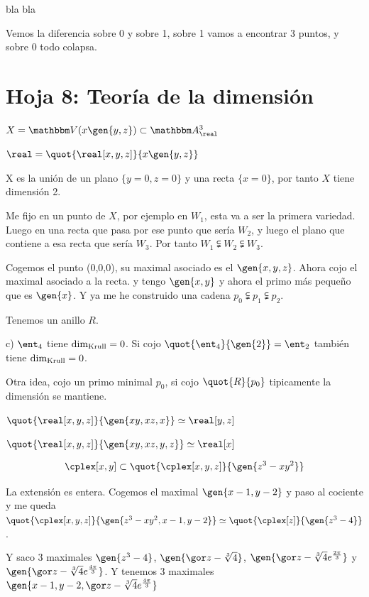 \begin{problem}[6]
	bla bla

	\solution

	Vemos la diferencia sobre 0 y sobre 1, sobre 1 vamos a encontrar 3 puntos, y sobre 0 todo colapsa.
\end{problem}


\section{Hoja 8: Teoría de la dimensión}

\begin{problem}[4]
	$X= \V(x \gen{y,z}) \subset \A^3_{\real}$

	$\real= \quot{\real[x,y,z]}{x\gen{y,z}}$
	\solution

	X es la unión de un plano $\{ y=0, z=0 \}$ y una recta $\{ x=0 \}$, por tanto $X$ tiene dimensión 2.

	Me fijo en un punto de $X$, por ejemplo en $W_1$, esta va a ser la primera variedad. Luego en una recta que pasa por ese punto que sería $W_2$, y luego el plano que contiene a esa recta que sería $W_3$. Por tanto $W_1 \subsetneqq W_2 \subsetneqq W_3$.

	Cogemos el punto (0,0,0), su maximal asociado es el $\gen{x,y,z}$. Ahora cojo el maximal asociado a la recta. y tengo $\gen{x,y}$ y ahora el primo más pequeño que es $\gen{x}$. Y ya me he construido una cadena $p_0 \subsetneqq p_1 \subsetneqq p_2$.
\end{problem}

\begin{problem}[3]
	Tenemos un anillo $R$.

	\solution

	c) $\ent_4$ tiene $\dim_{\mathrm{Krull}}=0$. Si cojo $\quot{\ent_4}{\gen{2}}=\ent_2$ también tiene $\dim_{\mathrm{Krull}} = 0$.

	Otra idea, cojo un primo minimal $p_0$, si cojo $\quot{R}{p_0}$ tipicamente la dimensión se mantiene.

	$\quot{\real[x,y,z]}{\gen{xy,xz,x}} \simeq \real[y,z]$

	$\quot{\real[x,y,z]}{\gen{xy,xz,y,z}} \simeq \real[x]$
\end{problem}

\begin{problem}[6]

	$$ \cplex[x,y] \subset \quot{\cplex[x,y,z]}{\gen{z^3-xy^2}} $$


	\solution

	La extensión es entera. Cogemos el maximal $\gen{x-1, y-2}$ y paso al cociente y me queda $\quot{\cplex[x,y,z]}{\gen{z^3-xy^2, x-1, y-2}} \simeq \quot{\cplex[z]}{\gen{z^3-4}}$.

	Y saco 3 maximales $\gen{z^3-4}$, $\gen{\cls{z}-\sqrt[3]{4}}$, $\gen{\cls{z}-\sqrt[3]{4}e^{\frac{2 \pi}{3}}}$ y $\gen{\cls{z}-\sqrt[3]{4}e^{\frac{4 \pi}{3}}}$. Y tenemos 3 maximales $\gen{x-1, y-2, \cls{z}-\sqrt[3]{4}e^{\frac{4 \pi}{3}}}$


\end{problem}
